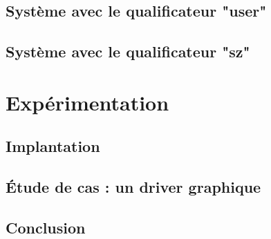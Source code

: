 \documentclass[a4paper,11pt]{memoir}
\begin{document}


\chapter{Système avec le qualificateur "user"}



\chapter{Système avec le qualificateur "sz"}



\part{Expérimentation}

\chapter{Implantation}

\label{cha:implem}


\chapter{Étude de cas : un driver graphique}


\chapter{Conclusion}



\backmatter


\listoffigures




\end{document}
